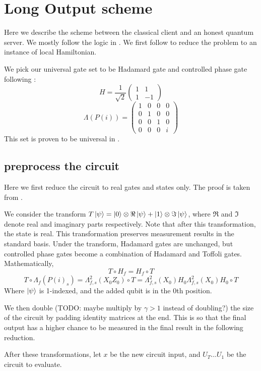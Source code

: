 \section{Long Output scheme}

Here we describe the scheme between the classical client and an honest quantum server. We mostly follow the logic in \cite{mahadev_delegation}. We first follow \cite{kempe_kitaev_regev_2006} to reduce the problem to an instance of local Hamiltonian.

We pick our universal gate set to be Hadamard gate and controlled phase gate following \cite{quant-ph/0301040}:
$$H=\frac{1}{\sqrt{2}}\begin{pmatrix}1&1\\1&-1\end{pmatrix}$$
$$\Lambda(P(i))=\begin{pmatrix}1&0&0&0\\0&1&0&0\\0&0&1&0\\0&0&0&i\end{pmatrix}$$
This set is proven to be universal in \cite{kitaev_1997}.

\subsection{preprocess the circuit}

Here we first reduce the circuit to real gates and states only. The proof is taken from \cite{quant-ph/0301040}.

We consider the transform $T\ket{\psi}=\ket{0}\otimes\Re\ket{\psi}+\ket{1}\otimes\Im\ket{\psi}$, where $\Re$ and $\Im$ denote real and imaginary parts respectively. Note that after this transformation, the state is real. This transformation preserves measurement results in the standard basis. Under the transform, Hadamard gates are unchanged, but controlled phase gates become a combination of Hadamard and Toffoli gates. Mathematically,
$$T\circ H_f=H_f\circ T$$
$$T\circ\Lambda_f(P(i)_s)=\Lambda^2_{f,s}(X_0Z_0)\circ T=\Lambda^2_{f,s}(X_0)H_0\Lambda^2_{f,s}(X_0)H_0\circ T$$
Where $\ket{\psi}$ is 1-indexed, and the added qubit is in the 0th position. 

We then double (TODO: maybe multiply by $\gamma>1$ instead of doubling?) the size of the circuit by padding identity matrices at the end. This is so that the final output has a higher chance to be measured in the final result in the following reduction.

After these transformations, let $x$ be the new circuit input, and $U_T...U_1$ be the circuit to evaluate.

